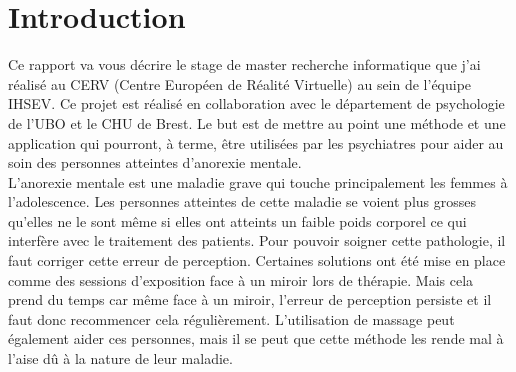 \documentclass[11pt]{article}
\begin{document}


\tableofcontents
\thispagestyle{empty}
\setcounter{page}{0} 
\newpage


\section{Introduction}

Ce rapport va vous décrire le stage de master recherche informatique que j'ai réalisé au CERV (Centre Européen de Réalité Virtuelle) au sein de l'équipe IHSEV. Ce projet est réalisé en collaboration avec le département de psychologie de l'UBO et le CHU de Brest. Le but est de mettre au point une méthode et une application qui pourront, à terme, être utilisées par les psychiatres pour aider au soin des personnes atteintes d'anorexie mentale.\\

L'anorexie mentale est une maladie grave qui touche principalement les femmes à l'adolescence. Les personnes atteintes de cette maladie se voient plus grosses qu’elles ne le sont même si elles ont atteints un faible poids corporel ce qui interfère avec le traitement des patients. Pour pouvoir soigner cette pathologie, il faut corriger cette erreur de perception. Certaines solutions ont été mise en place comme des sessions d'exposition face à un miroir lors de thérapie. Mais cela prend du temps car même face à un miroir, l'erreur de perception persiste et il faut donc recommencer cela régulièrement. L'utilisation de massage peut également aider ces personnes, mais il se peut que cette méthode les rende mal à l'aise dû à la nature de leur maladie.\\
\end{document}
